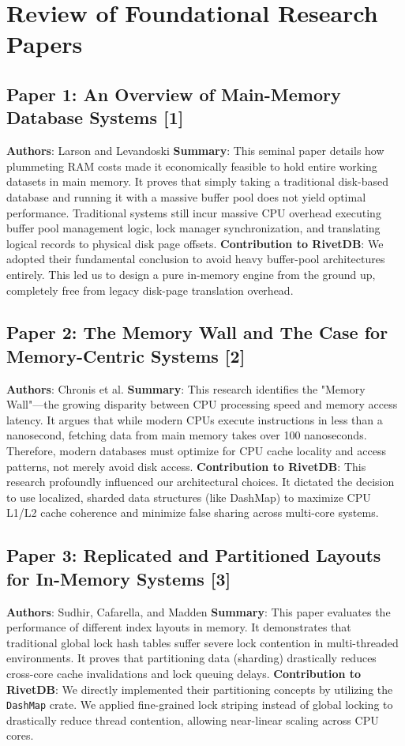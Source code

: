 \section{Review of Foundational Research Papers}

\subsection{Paper 1: An Overview of Main-Memory Database Systems [1]}
\textbf{Authors}: Larson and Levandoski
\textbf{Summary}: This seminal paper details how plummeting RAM costs made it economically feasible to hold entire working datasets in main memory. It proves that simply taking a traditional disk-based database and running it with a massive buffer pool does not yield optimal performance. Traditional systems still incur massive CPU overhead executing buffer pool management logic, lock manager synchronization, and translating logical records to physical disk page offsets.
\textbf{Contribution to RivetDB}: We adopted their fundamental conclusion to avoid heavy buffer-pool architectures entirely. This led us to design a pure in-memory engine from the ground up, completely free from legacy disk-page translation overhead.

\subsection{Paper 2: The Memory Wall and The Case for Memory-Centric Systems [2]}
\textbf{Authors}: Chronis et al.
\textbf{Summary}: This research identifies the "Memory Wall"—the growing disparity between CPU processing speed and memory access latency. It argues that while modern CPUs execute instructions in less than a nanosecond, fetching data from main memory takes over 100 nanoseconds. Therefore, modern databases must optimize for CPU cache locality and access patterns, not merely avoid disk access.
\textbf{Contribution to RivetDB}: This research profoundly influenced our architectural choices. It dictated the decision to use localized, sharded data structures (like DashMap) to maximize CPU L1/L2 cache coherence and minimize false sharing across multi-core systems.

\subsection{Paper 3: Replicated and Partitioned Layouts for In-Memory Systems [3]}
\textbf{Authors}: Sudhir, Cafarella, and Madden
\textbf{Summary}: This paper evaluates the performance of different index layouts in memory. It demonstrates that traditional global lock hash tables suffer severe lock contention in multi-threaded environments. It proves that partitioning data (sharding) drastically reduces cross-core cache invalidations and lock queuing delays.
\textbf{Contribution to RivetDB}: We directly implemented their partitioning concepts by utilizing the \texttt{DashMap} crate. We applied fine-grained lock striping instead of global locking to drastically reduce thread contention, allowing near-linear scaling across CPU cores.

